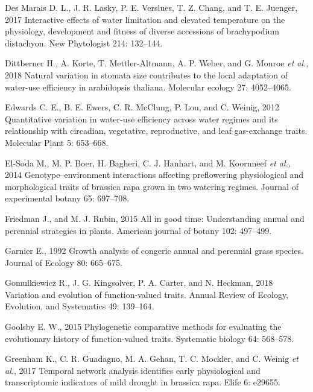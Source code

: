 \documentclass[jou,floatsintext]{apa6}
\begin{document}
\leavevmode\hypertarget{ref-des2017interactive}{}%
Des Marais D. L., J. R. Lasky, P. E. Verslues, T. Z. Chang, and T. E. Juenger, 2017 Interactive effects of water limitation and elevated temperature on the physiology, development and fitness of diverse accessions of brachypodium distachyon. New Phytologist 214: 132--144.

\leavevmode\hypertarget{ref-dittberner2018natural}{}%
Dittberner H., A. Korte, T. Mettler-Altmann, A. P. Weber, and G. Monroe \emph{et al.}, 2018 Natural variation in stomata size contributes to the local adaptation of water-use efficiency in arabidopsis thaliana. Molecular ecology 27: 4052--4065.

\leavevmode\hypertarget{ref-edwards2012quantitative}{}%
Edwards C. E., B. E. Ewers, C. R. McClung, P. Lou, and C. Weinig, 2012 Quantitative variation in water-use efficiency across water regimes and its relationship with circadian, vegetative, reproductive, and leaf gas-exchange traits. Molecular Plant 5: 653--668.

\leavevmode\hypertarget{ref-el2014genotype}{}%
El-Soda M., M. P. Boer, H. Bagheri, C. J. Hanhart, and M. Koornneef \emph{et al.}, 2014 Genotype--environment interactions affecting preflowering physiological and morphological traits of brassica rapa grown in two watering regimes. Journal of experimental botany 65: 697--708.

\leavevmode\hypertarget{ref-friedman2015all}{}%
Friedman J., and M. J. Rubin, 2015 All in good time: Understanding annual and perennial strategies in plants. American journal of botany 102: 497--499.

\leavevmode\hypertarget{ref-garnier1992growth}{}%
Garnier E., 1992 Growth analysis of congeric annual and perennial grass species. Journal of Ecology 80: 665--675.

\leavevmode\hypertarget{ref-gomulkiewicz2018variation}{}%
Gomulkiewicz R., J. G. Kingsolver, P. A. Carter, and N. Heckman, 2018 Variation and evolution of function-valued traits. Annual Review of Ecology, Evolution, and Systematics 49: 139--164.

\leavevmode\hypertarget{ref-goolsby2015phylogenetic}{}%
Goolsby E. W., 2015 Phylogenetic comparative methods for evaluating the evolutionary history of function-valued traits. Systematic biology 64: 568--578.

\leavevmode\hypertarget{ref-greenham2017temporal}{}%
Greenham K., C. R. Guadagno, M. A. Gehan, T. C. Mockler, and C. Weinig \emph{et al.}, 2017 Temporal network analysis identifies early physiological and transcriptomic indicators of mild drought in brassica rapa. Elife 6: e29655.
\end{document}
